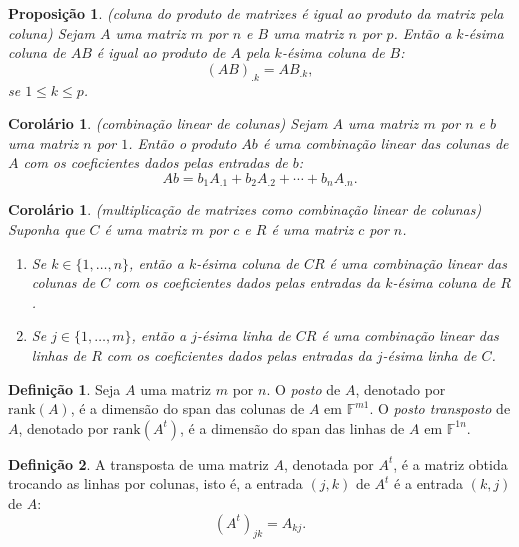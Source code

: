 \documentclass[12pt]{article}
\theoremstyle{plain}
\newtheorem{prop}[thm]{Proposição}
\newtheorem{cor}[thm]{Corolário}
\theoremstyle{definition}
\newtheorem{defn}{Definição}[section]
\theoremstyle{remark}
\begin{document}
\begin{prop} (coluna do produto de matrizes é igual ao produto da matriz pela coluna)
    Sejam \(A\) uma matriz \(m\) por \(n\) e \(B\) uma matriz \(n\) por \(p\). Então a \(k\)-ésima coluna de \(AB\) é igual ao produto de \(A\) pela \(k\)-ésima coluna de \(B\):
    \[
        (AB)_{.k} = A B_{.k},
    \]
    \noindent se \(1 \leq k \leq p\).
\end{prop}

\begin{cor} (combinação linear de colunas)
    Sejam \(A\) uma matriz \(m\) por \(n\) e \(b\) uma matriz \(n\) por \(1\). Então o produto \(Ab\) é uma combinação linear das colunas de \(A\) com os coeficientes dados pelas entradas de \(b\):
    \[
        Ab = b_1 A_{.1} + b_2 A_{.2} + \cdots + b_n A_{.n}.
    \]
\end{cor}

\begin{cor} (multiplicação de matrizes como combinação linear de colunas)
    Suponha que \(C\) é uma matriz \(m\) por \(c\) e \(R\) é uma matriz \(c\) por \(n\).
    \begin{enumerate}
        \item[\textup{(a)}] Se \(k \in \{1, \ldots, n\}\), então a \(k\)-ésima coluna de \(CR\) é uma combinação linear das colunas de \(C\) com os coeficientes dados pelas entradas da \(k\)-ésima coluna de \(R\).
        \item[\textup{(b)}] Se \(j \in \{1, \ldots, m\}\), então a \(j\)-ésima linha de \(CR\) é uma combinação linear das linhas de \(R\) com os coeficientes dados pelas entradas da \(j\)-ésima linha de \(C\).
    \end{enumerate}
\end{cor}

\begin{defn}
    Seja \(A\) uma matriz \(m\) por \(n\). O \emph{posto} de \(A\), denotado por \(\text{rank}(A)\), é a dimensão do span das colunas de \(A\) em \(\mathbb{F}^{m1}\). O \emph{posto transposto} de \(A\), denotado por \(\text{rank}(A^t)\), é a dimensão do span das linhas de \(A\) em \(\mathbb{F}^{1n}\).
\end{defn}

\begin{defn}
    A transposta de uma matriz \(A\), denotada por \(A^t\), é a matriz obtida trocando as linhas por colunas, isto é, a entrada \((j, k)\) de \(A^t\) é a entrada \((k, j)\) de \(A\):
    \[
        (A^t)_{jk} = A_{kj}.
    \]
\end{defn}
\end{document}
